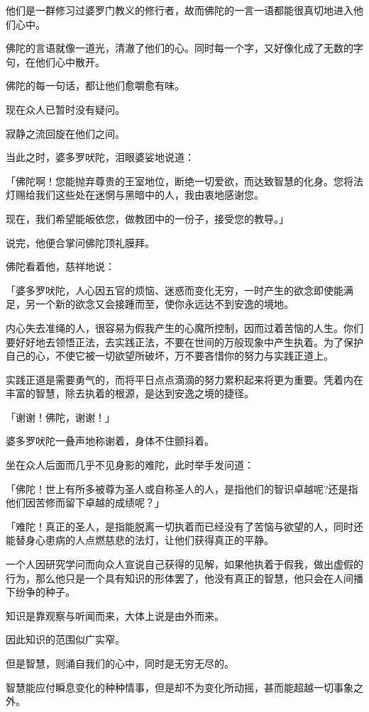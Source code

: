\documentclass[twoside,openany]{book}
\begin{document}
他们是一群修习过婆罗门教义的修行者，故而佛陀的一言一语都能很真切地进入他们心中。

佛陀的言语就像一道光，清澈了他们的心。同时每一个字，又好像化成了无数的字句，在他们心中散开。

佛陀的每一句话，都让他们愈嚼愈有味。

现在众人已暂时没有疑问。

寂静之流回旋在他们之间。

当此之时，婆多罗吠陀，泪眼婆娑地说道：

「佛陀啊！您能抛弃尊贵的王室地位，断绝一切爱欲，而达致智慧的化身。您将法灯赐给我们这些处在迷惘与黑暗中的人，我由衷地感谢您。

现在，我们希望能皈依您，做教团中的一份子，接受您的教导。」

说完，他便合掌问佛陀顶礼膜拜。

佛陀看着他，慈祥地说：

「婆多罗吠陀，人心因五官的烦恼、迷惑而变化无穷，一时产生的欲念即使能满足，另一个新的欲念又会接踵而至，使你永远达不到安逸的境地。

内心失去准绳的人，很容易为假我产生的心魔所控制，因而过着苦恼的人生。你们要好好地去领悟正法，去实践正法，不要在世间的万般现象中产生执着。为了保护自己的心，不使它被一切欲望所破坏，万不要吝惜你的努力与实践正道上。

实践正道是需要勇气的，而将平日点点滴滴的努力累积起来将更为重要。凭着内在丰富的智慧，除去执着的根源，是达到安逸之境的捷径。

「谢谢！佛陀，谢谢！」

婆多罗吠陀一叠声地称谢着，身体不住颤抖着。

坐在众人后面而几乎不见身影的难陀，此时举手发问道：

「佛陀！世上有所多被尊为圣人或自称圣人的人，是指他们的智识卓越呢?还是指他们因苦修而留下卓越的成绩呢？」

「难陀！真正的圣人，是指能脱离一切执着而已经没有了苦恼与欲望的人，同时还能替身心患病的人点燃慈悲的法灯，让他们获得真正的平静。

一个人因研究学问而向众人宣说自己获得的见解，如果他执着于假我，做出虚假的行为，那么他只是一个具有知识的形体罢了，他没有真正的智慧，他只会在人间播下纷争的种子。

知识是靠观察与听闻而来，大体上说是由外而来。

因此知识的范围似广实窄。

但是智慧，则涌自我们的心中，同时是无穷无尽的。

智慧能应付瞬息变化的种种情事，但是却不为变化所动摇，甚而能超越一切事象之外。
\end{document}
